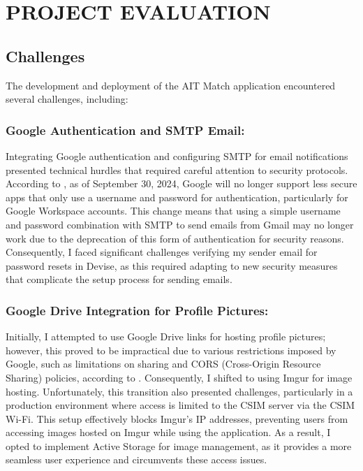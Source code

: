 \setlength{\footskip}{8mm}
\chapter{PROJECT EVALUATION}
\section{Challenges}
The development and deployment of the AIT Match application encountered several challenges, including:

    \subsection{Google Authentication and SMTP Email:} Integrating Google authentication and configuring SMTP for email notifications presented technical hurdles that required careful attention to security protocols. According to \cite{google_authentication}, as of September 30, 2024, Google will no longer support less secure apps that only use a username and password for authentication, particularly for Google Workspace accounts. This change means that using a simple username and password combination with SMTP to send emails from Gmail may no longer work due to the deprecation of this form of authentication for security reasons. Consequently, I faced significant challenges verifying my sender email for password resets in Devise, as this required adapting to new security measures that complicate the setup process for sending emails.
    
    \subsection{Google Drive Integration for Profile Pictures:}
    Initially, I attempted to use Google Drive links for hosting profile pictures; however, this proved to be impractical due to various restrictions imposed by Google, such as limitations on sharing and CORS (Cross-Origin Resource Sharing) policies, according to \cite{google_drive_restrictions}. Consequently, I shifted to using Imgur for image hosting. Unfortunately, this transition also presented challenges, particularly in a production environment where access is limited to the CSIM server via the CSIM Wi-Fi. This setup effectively blocks Imgur's IP addresses, preventing users from accessing images hosted on Imgur while using the application. As a result, I opted to implement Active Storage for image management, as it provides a more seamless user experience and circumvents these access issues.

